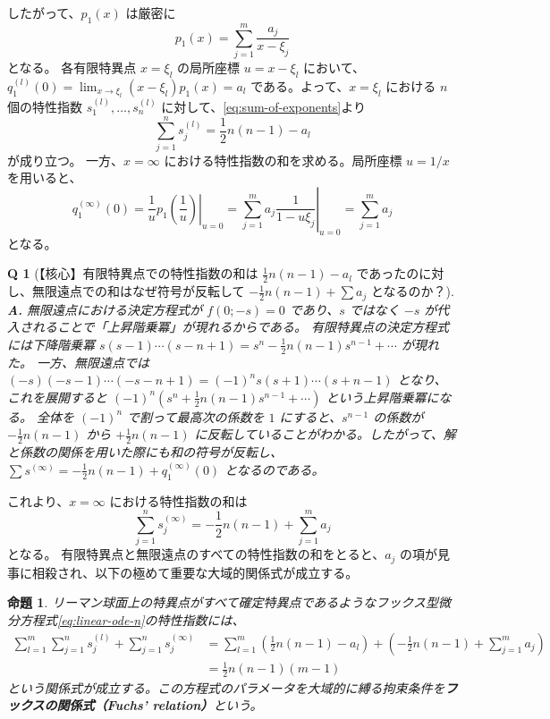\documentclass[paper=a4, fontsize=11pt]{jlreq} %
\theoremstyle{break}
\newtheorem{proposition}[theorem]{命題}
\theoremstyle{qa}
\newtheorem*{Q}{Q}
\theoremstyle{remark} %
\begin{document}
したがって、$p_{1}(x)$ は厳密に
\[
p_{1}(x) = \sum_{j=1}^{m} \frac{a_{j}}{x-\xi_{j}}
\]
となる。
各有限特異点 $x=\xi_{l}$ の局所座標 $u = x-\xi_{l}$ において、$q_{1}^{(l)}(0) = \lim_{x \to \xi_{l}} (x-\xi_{l})p_{1}(x) = a_{l}$ である。よって、$x=\xi_{l}$ における $n$ 個の特性指数 $s_{1}^{(l)}, \dots, s_{n}^{(l)}$ に対して、\eqref{eq:sum-of-exponents}より
\[
\sum_{j=1}^{n} s_{j}^{(l)} = \frac{1}{2}n(n-1) - a_{l}
\]
が成り立つ。
一方、$x=\infty$ における特性指数の和を求める。局所座標 $u=1/x$ を用いると、
\[
q_{1}^{(\infty)}(0) = \left. \frac{1}{u}p_{1}\left(\frac{1}{u}\right) \right|_{u=0} = \left. \sum_{j=1}^{m} a_{j}\frac{1}{1-u\xi_{j}} \right|_{u=0} = \sum_{j=1}^{m} a_{j}
\]
となる。

\begin{Q}[【核心】有限特異点での特性指数の和は $\frac{1}{2}n(n-1) - a_{l}$ であったのに対し、無限遠点での和はなぜ符号が反転して $-\frac{1}{2}n(n-1) + \sum a_{j}$ となるのか？]
\textbf{A.} 無限遠点における決定方程式が $f(0; -s) = 0$ であり、$s$ ではなく $-s$ が代入されることで「上昇階乗冪」が現れるからである。
有限特異点の決定方程式には下降階乗冪 $s(s-1)\cdots(s-n+1) = s^{n} - \frac{1}{2}n(n-1)s^{n-1} + \cdots$ が現れた。
一方、無限遠点では $(-s)(-s-1)\cdots(-s-n+1) = (-1)^{n} s(s+1)\cdots(s+n-1)$ となり、これを展開すると $(-1)^{n} (s^{n} + \frac{1}{2}n(n-1)s^{n-1} + \cdots)$ という上昇階乗冪になる。
全体を $(-1)^{n}$ で割って最高次の係数を $1$ にすると、$s^{n-1}$ の係数が $-\frac{1}{2}n(n-1)$ から $+\frac{1}{2}n(n-1)$ に反転していることがわかる。したがって、解と係数の関係を用いた際にも和の符号が反転し、$\sum s^{(\infty)} = -\frac{1}{2}n(n-1) + q_{1}^{(\infty)}(0)$ となるのである。
\end{Q}

これより、$x=\infty$ における特性指数の和は
\[
\sum_{j=1}^{n}s_{j}^{(\infty)} = -\frac{1}{2}n(n-1) + \sum_{j=1}^{m} a_{j}
\]
となる。
有限特異点と無限遠点のすべての特性指数の和をとると、$a_{j}$ の項が見事に相殺され、以下の極めて重要な大域的関係式が成立する。

\begin{proposition}\label{prop:fuchs_relation}
リーマン球面上の特異点がすべて確定特異点であるようなフックス型微分方程式\eqref{eq:linear-ode-n}の特性指数には、
\begin{align*}
\sum_{l=1}^{m}\sum_{j=1}^{n} s_{j}^{(l)} + \sum_{j=1}^{n} s_{j}^{(\infty)} &= \sum_{l=1}^{m} \left( \frac{1}{2}n(n-1) - a_{l} \right) + \left( -\frac{1}{2}n(n-1) + \sum_{j=1}^{m} a_{j} \right) \\
&= \frac{1}{2}n(n-1)(m-1)
\end{align*}
という関係式が成立する。この方程式のパラメータを大域的に縛る拘束条件を\textbf{フックスの関係式（Fuchs' relation）}という。
\end{proposition}
\end{document}
